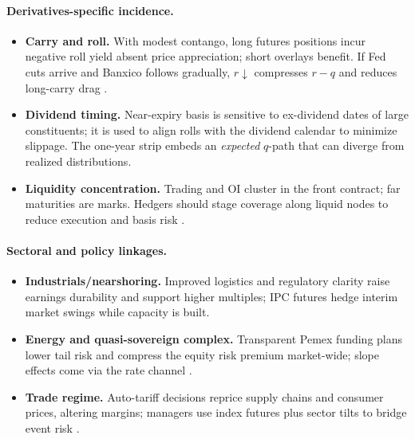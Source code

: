 \documentclass[11pt,a4paper]{article} %
\begin{document}
\paragraph{Derivatives-specific incidence.}
\begin{itemize}
  \item \textbf{Carry and roll.} With modest contango, long futures positions incur negative roll yield absent price appreciation; short overlays benefit. If Fed cuts arrive and Banxico follows gradually, \(r\downarrow\) compresses \(r-q\) and reduces long-carry drag \citep{reuters_ipc_record_2025}.
  \item \textbf{Dividend timing.} Near-expiry basis is sensitive to ex-dividend dates of large constituents; it is used to align rolls with the dividend calendar to minimize slippage. The one-year strip embeds an \emph{expected} \(q\)-path that can diverge from realized distributions.
  \item \textbf{Liquidity concentration.} Trading and OI cluster in the front contract; far maturities are marks. Hedgers should stage coverage along liquid nodes to reduce execution and basis risk \citep{mexder_ipc_fut}.
\end{itemize}

\paragraph{Sectoral and policy linkages.}
\begin{itemize}
  \item \textbf{Industrials/nearshoring.} Improved logistics and regulatory clarity raise earnings durability and support higher multiples; IPC futures hedge interim market swings while capacity is built.
  \item \textbf{Energy and quasi-sovereign complex.} Transparent Pemex funding plans lower tail risk and compress the equity risk premium market-wide; slope effects come via the rate channel \citep{reuters_pemex_plan_2025}.
  \item \textbf{Trade regime.} Auto-tariff decisions reprice supply chains and consumer prices, altering margins; managers use index futures plus sector tilts to bridge event risk \citep{reuters_tariffs_china_autos_2025}.
\end{itemize}
\end{document}
